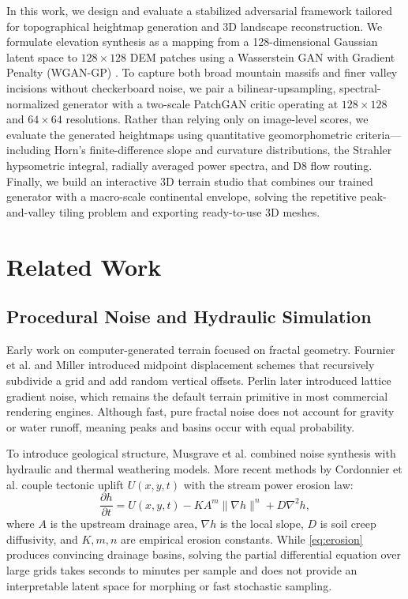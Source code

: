 \documentclass[conference]{IEEEtran}
\begin{document}
In this work, we design and evaluate a stabilized adversarial framework tailored for topographical heightmap generation and 3D landscape reconstruction. We formulate elevation synthesis as a mapping from a 128-dimensional Gaussian latent space to $128\times 128$ DEM patches using a Wasserstein GAN with Gradient Penalty (WGAN-GP) \cite{b14}. To capture both broad mountain massifs and finer valley incisions without checkerboard noise, we pair a bilinear-upsampling, spectral-normalized generator with a two-scale PatchGAN critic operating at $128\times 128$ and $64\times 64$ resolutions. Rather than relying only on image-level scores, we evaluate the generated heightmaps using quantitative geomorphometric criteria—including Horn's finite-difference slope and curvature distributions, the Strahler hypsometric integral, radially averaged power spectra, and D8 flow routing. Finally, we build an interactive 3D terrain studio that combines our trained generator with a macro-scale continental envelope, solving the repetitive peak-and-valley tiling problem and exporting ready-to-use 3D meshes.

\section{Related Work}

\subsection{Procedural Noise and Hydraulic Simulation}
Early work on computer-generated terrain focused on fractal geometry. Fournier et al. \cite{b3} and Miller \cite{b4} introduced midpoint displacement schemes that recursively subdivide a grid and add random vertical offsets. Perlin \cite{b8, b9} later introduced lattice gradient noise, which remains the default terrain primitive in most commercial rendering engines. Although fast, pure fractal noise does not account for gravity or water runoff, meaning peaks and basins occur with equal probability.

To introduce geological structure, Musgrave et al. \cite{b5} combined noise synthesis with hydraulic and thermal weathering models. More recent methods by Cordonnier et al. \cite{b6} couple tectonic uplift $U(x,y,t)$ with the stream power erosion law:
\begin{equation}
\frac{\partial h}{\partial t} = U(x, y, t) - K A^m \|\nabla h\|^n + D \nabla^2 h, \label{eq:erosion}
\end{equation}
where $A$ is the upstream drainage area, $\nabla h$ is the local slope, $D$ is soil creep diffusivity, and $K, m, n$ are empirical erosion constants. While \eqref{eq:erosion} produces convincing drainage basins, solving the partial differential equation over large grids takes seconds to minutes per sample and does not provide an interpretable latent space for morphing or fast stochastic sampling.
\end{document}
